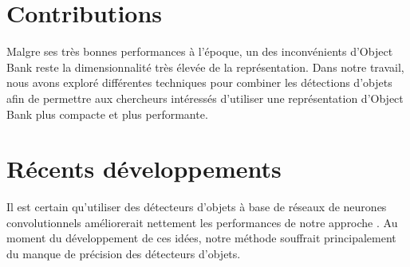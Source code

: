 \section{Contributions}

Malgre ses tr\`{e}s bonnes performances \`{a} l'\'{e}poque, un des
inconv\'{e}nients d'Object Bank reste la dimensionnalit\'{e} tr\`{e}s
\'{e}lev\'{e}e de la repr\'{e}sentation.  Dans notre travail, nous avons
explor\'{e} diff\'{e}rentes techniques pour combiner les d\'{e}tections
d'objets afin de permettre aux chercheurs int\'{e}ress\'{e}s d'utiliser une
repr\'{e}sentation d'Object Bank plus compacte et plus performante.


\section{R\'{e}cents d\'{e}veloppements}

Il est certain qu'utiliser des d\'{e}tecteurs d'objets \`{a} base de
r\'{e}seaux de neurones convolutionnels am\'{e}liorerait nettement les
performances de notre approche \citep{Scene-14}.  Au moment du
d\'{e}veloppement de ces id\'{e}es, notre m\'{e}thode souffrait principalement
du manque de pr\'{e}cision des d\'{e}tecteurs d'objets. 
